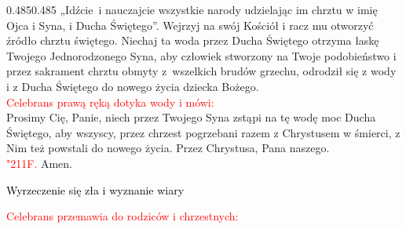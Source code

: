 \documentclass[11pt, a5paper]{extarticle}
\newcommand{\textjuni}[1]{{\fontspec{Junicode}#1}}
\newcommand{\response}{\textcolor{red}{\textjuni{\char"211F. }}}
\begin{document}
\begin{Parallel}[v]{0.485\textwidth}{0.485\textwidth}
{„Idźcie~i nauczajcie wszystkie narody
udzielając im chrztu w imię Ojca i Syna, i Ducha Świętego”.
Wejrzyj na swój Kościół
i racz mu otworzyć źródło chrztu świętego.
Niechaj ta woda przez Ducha Świętego otrzyma łaskę
Twojego Jednorodzonego Syna,
aby człowiek stworzony na Twoje podobieństwo
i przez sakrament chrztu obmyty z~wszelkich brudów grzechu,
odrodził się z wody i z Ducha Świętego
do nowego życia dziecka Bożego. \\
\textcolor{red}{Celebrans prawą ręką dotyka wody i mówi:} \\
Prosimy Cię, Panie, niech przez Twojego Syna
zstąpi na tę wodę moc Ducha Świętego,
aby wszyscy, przez chrzest pogrzebani
razem z Chrystusem w śmierci,
z Nim też powstali do nowego życia.
Przez Chrystusa, Pana naszego. \\
\response Amen.
}
\end{Parallel}


\begin{center}
\Large
\noindent\textcolor{black}{Wyrzeczenie się zła i wyznanie wiary}
\end{center}

\textcolor{red}{Celebrans przemawia do rodziców i chrzestnych:}
\end{document}
